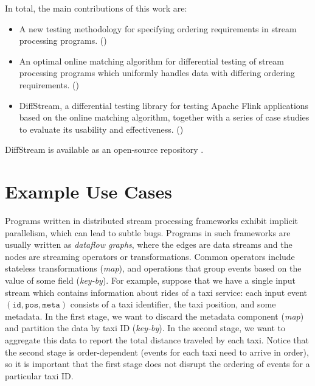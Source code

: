 In total, the main contributions of this work are:
\begin{itemize}
    \item A new testing methodology for specifying ordering
      requirements in stream processing programs. ()
    \item An optimal online matching algorithm for differential
      testing of stream processing programs which uniformly handles
      data with differing ordering requirements. ()
    \item DiffStream, a differential testing library for testing Apache
      Flink applications based on the online matching algorithm, together with a series of case studies to evaluate its
        usability and effectiveness.
        ()
\end{itemize}

DiffStream is available as an open-source repository .

\section{Example Use Cases}
\label{diffstream:ssec:motivating-examples}
\label{diffstream:sec:overview}

Programs written in distributed stream processing frameworks exhibit implicit parallelism, which can lead to subtle bugs. Programs in such frameworks are usually written as \emph{dataflow graphs}, where the edges are data streams and the nodes are streaming operators or transformations.
Common operators include stateless transformations (\emph{map}), and operations that group events based on the value of some field (\emph{key-by}).
For example, suppose that we have a single input stream which contains information about rides of a taxi service: each input event $(\texttt{id}, \texttt{pos}, \texttt{meta})$ consists of a taxi identifier, the taxi position, and some metadata. In the first stage, we want to discard the metadata component (\emph{map}) and partition the data by taxi ID (\emph{key-by}). In the second stage, we want to aggregate this data to report the total distance traveled by each taxi. Notice that the second stage is order-dependent (events for each taxi need to arrive in order), so it is important that the first stage does not disrupt the ordering of events for a particular taxi ID.

